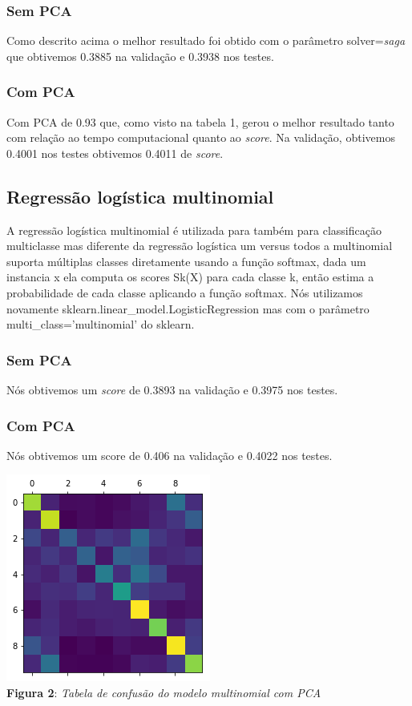 \documentclass[conference]{IEEEtran}
\begin{document}
\subsubsection{Sem PCA}
Como descrito acima o melhor resultado foi obtido com o parâmetro solver=\textit{saga} que obtivemos 0.3885 na validação e 0.3938 nos testes.

\subsubsection{Com PCA}
Com PCA de 0.93 que, como visto na tabela 1, gerou o melhor resultado tanto com relação ao tempo computacional quanto ao \textit{score}. Na validação, obtivemos 0.4001 nos testes obtivemos 0.4011 de \textit{score}.


\subsection{Regressão logística multinomial}

A regressão logística multinomial é utilizada para também para classificação multiclasse
mas diferente da regressão logística um versus todos a multinomial suporta múltiplas classes
diretamente usando a função softmax, dada um instancia x ela computa os scores Sk(X) para cada
classe k, então estima a probabilidade de cada classe aplicando a função softmax. Nós utilizamos 
novamente sklearn.linear\_model.LogisticRegression mas com o parâmetro multi\_class='multinomial' do sklearn.

\subsubsection{Sem PCA}
Nós obtivemos um \textit{score} de 0.3893 na validação e 0.3975 nos testes.

\subsubsection{Com PCA}
Nós obtivemos um score de 0.406 na validação e 0.4022 nos testes.

\begin{center}
\includegraphics[scale=0.75]{umcontrapca.png}
\\
\textbf{Figura 2}: \textit{Tabela de confusão do modelo multinomial com PCA}
\end{center}
\end{document}
